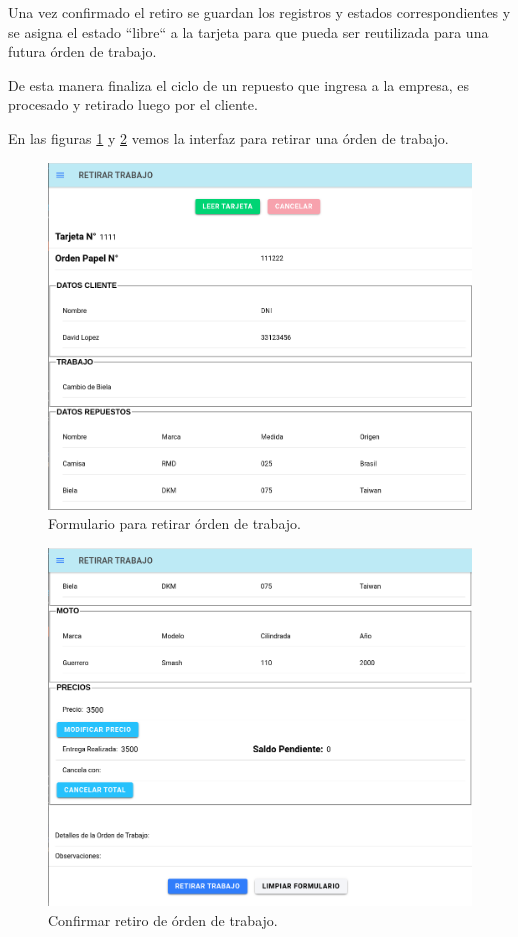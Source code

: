 Una vez confirmado el retiro se guardan los registros y estados correspondientes y se asigna el estado ``libre`` a la tarjeta para que pueda ser reutilizada para una futura órden de trabajo.

De esta manera finaliza el ciclo de un repuesto que ingresa a la empresa, es procesado y retirado luego por el cliente.

En las figuras \ref{fig:retirar1} y \ref{fig:retirar2} vemos la interfaz para retirar una órden de trabajo.

\begin{figure}[H]
	\centering
	\includegraphics[scale=.30]{./Figures/retirar-1.png}
	\caption{Formulario para retirar órden de trabajo.}
	\label{fig:retirar1}
\end{figure}

\begin{figure}[H]
	\centering
	\includegraphics[scale=.30]{./Figures/retirar-2.png}
	\caption{Confirmar retiro de órden de trabajo.}
	\label{fig:retirar2}
\end{figure}

